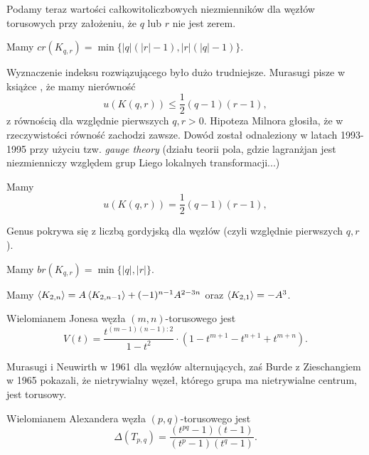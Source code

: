 Podamy teraz wartości całkowitoliczbowych niezmienników dla węzłów torusowych przy założeniu, że $q$ lub $r$ nie jest zerem.

\begin{proposition}[Murasugi, 1991]
    Mamy $cr(K_{q,r}) = \min\{|q|(|r| -1), |r|(|q|-1)\}$.
\end{proposition}

Wyznaczenie indeksu rozwiązującego było dużo trudniejsze.
Murasugi pisze w książce \cite{murasugi96}, że mamy nierówność
\[
    u(K(q, r)) \le \frac 12 (q-1)(r-1),
\]
z równością dla względnie pierwszych $q, r > 0$.
Hipoteza Milnora głosiła, że w rzeczywistości równość zachodzi zawsze.
Dowód został odnaleziony w latach 1993-1995 przy użyciu tzw. \emph{gauge theory} (działu teorii pola, gdzie lagranżjan jest niezmienniczy względem grup Liego lokalnych transformacji...)

\begin{proposition} \label{torus_unknotting}
    Mamy
    \[
        u(K(q, r)) = \frac 12 (q-1)(r-1),
    \]
\end{proposition}

Genus pokrywa się z liczbą gordyjską dla węzłów (czyli względnie pierwszych $q, r$).

\begin{proposition} \label{torus_bridge}
    Mamy $br(K_{q,r}) = \min \{|q|, |r|\}$.
\end{proposition}

\begin{proposition}
    Mamy $\left\langle{K_{2, n}}\right\rangle = A \left\langle{K_{2,n-1}}\right\rangle + (-1)^{n-1} A^{2-3n}$
    oraz $\left\langle{K_{2,1}}\right\rangle = -A^3$.
\end{proposition}

\begin{proposition}
    Wielomianem Jonesa węzła $(m, n)$-torusowego jest
    \[
        V(t) = \frac {t^{(m-1)(n-1):2}}{1-t^2} \cdot (1 - t^{m+1} - t^{n+1} + t^{m+n}).
    \]
\end{proposition}

Murasugi i Neuwirth w 1961 dla węzłów alternujących,
zaś Burde z Zieschangiem w 1965 pokazali, że nietrywialny węzeł,
którego grupa ma nietrywialne centrum, jest torusowy.

\begin{proposition}
    Wielomianem Alexandera węzła $(p,q)$-torusowego jest
    \[
         \Delta(T_{p,q}) = \frac{(t^{pq}-1)(t-1)}{(t^p-1)(t^q-1)}.
    \]
\end{proposition}

